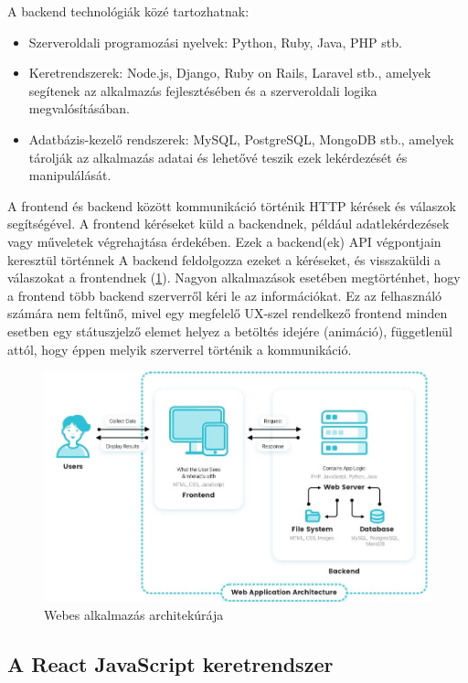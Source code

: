 A backend technológiák közé tartozhatnak:
\begin{itemize}
	\item Szerveroldali programozási nyelvek: Python, Ruby, Java, PHP stb.
	\item Keretrendszerek: Node.js, Django, Ruby on Rails, Laravel stb., amelyek segítenek az alkalmazás fejlesztésében és a szerveroldali logika megvalósításában.
	\item Adatbázis-kezelő rendszerek: MySQL, PostgreSQL, MongoDB stb., amelyek tárolják az alkalmazás adatai és lehetővé teszik ezek lekérdezését és manipulálását.
\end{itemize}

A frontend és backend között kommunikáció történik HTTP kérések és válaszok segítségével. A frontend kéréseket küld a backendnek, például adatlekérdezések vagy műveletek végrehajtása érdekében. Ezek a backend(ek) API végpontjain keresztül történnek A backend feldolgozza ezeket a kéréseket, és visszaküldi a válaszokat a frontendnek (\ref{abra:Architektura}). Nagyon alkalmazások esetében megtörténhet, hogy a frontend több backend szerverről kéri le az információkat. Ez az felhasználó számára nem feltűnő, mivel egy megfelelő UX-szel rendelkező frontend minden esetben egy státuszjelző elemet helyez a betöltés idejére (animáció), függetlenül attól, hogy éppen melyik szerverrel történik a kommunikáció.

\begin{figure}[!h]
	\centering
	\includegraphics[scale=0.2]{images/architektura}
	\caption{Webes alkalmazás architekúrája}
	\label{abra:Architektura}
\end{figure}

\subsection {A React JavaScript keretrendszer}

